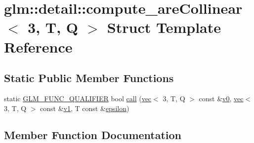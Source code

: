 \hypertarget{structglm_1_1detail_1_1compute__are_collinear_3_013_00_01_t_00_01_q_01_4}{}\section{glm\+:\+:detail\+:\+:compute\+\_\+are\+Collinear$<$ 3, T, Q $>$ Struct Template Reference}
\label{structglm_1_1detail_1_1compute__are_collinear_3_013_00_01_t_00_01_q_01_4}
\subsection*{Static Public Member Functions}
\begin{DoxyCompactItemize}
\item 
static \hyperlink{setup_8hpp_a33fdea6f91c5f834105f7415e2a64407}{G\+L\+M\+\_\+\+F\+U\+N\+C\+\_\+\+Q\+U\+A\+L\+I\+F\+I\+ER} bool \hyperlink{structglm_1_1detail_1_1compute__are_collinear_3_013_00_01_t_00_01_q_01_4_ad89215d790bc1b3d246a597e261c32f4}{call} (\hyperlink{structglm_1_1vec}{vec}$<$ 3, T, Q $>$ const \&\hyperlink{_s_d_l__opengl__glext_8h_a7062a23d1d434121d4a88f530703d06a}{v0}, \hyperlink{structglm_1_1vec}{vec}$<$ 3, T, Q $>$ const \&\hyperlink{_s_d_l__opengl__glext_8h_a435c176a02c061b43e19bdf7c86cceae}{v1}, T const \&\hyperlink{group__gtc__constants_ga2a1e57fc5592b69cfae84174cbfc9429}{epsilon})
\end{DoxyCompactItemize}


\subsection{Member Function Documentation}
\mbox{\label{structglm_1_1detail_1_1compute__are_collinear_3_013_00_01_t_00_01_q_01_4_ad89215d790bc1b3d246a597e261c32f4}} 

